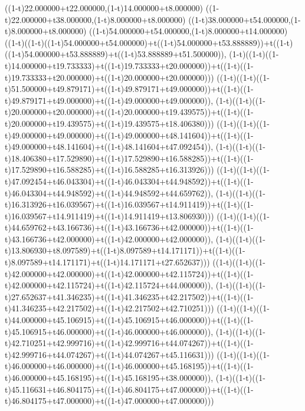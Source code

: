 ((1-t)22.000000+t22.000000,(1-t)14.000000+t8.000000)
((1-t)22.000000+t38.000000,(1-t)8.000000+t8.000000)
((1-t)38.000000+t54.000000,(1-t)8.000000+t8.000000)
((1-t)54.000000+t54.000000,(1-t)8.000000+t14.000000)
((1-t)((1-t)((1-t)54.000000+t54.000000)+t((1-t)54.000000+t53.888889))+t((1-t)((1-t)54.000000+t53.888889)+t((1-t)53.888889+t51.500000)),                                     (1-t)((1-t)((1-t)14.000000+t19.733333)+t((1-t)19.733333+t20.000000))+t((1-t)((1-t)19.733333+t20.000000)+t((1-t)20.000000+t20.000000)))
((1-t)((1-t)((1-t)51.500000+t49.879171)+t((1-t)49.879171+t49.000000))+t((1-t)((1-t)49.879171+t49.000000)+t((1-t)49.000000+t49.000000)),                                     (1-t)((1-t)((1-t)20.000000+t20.000000)+t((1-t)20.000000+t19.439575))+t((1-t)((1-t)20.000000+t19.439575)+t((1-t)19.439575+t18.406380)))
((1-t)((1-t)((1-t)49.000000+t49.000000)+t((1-t)49.000000+t48.141604))+t((1-t)((1-t)49.000000+t48.141604)+t((1-t)48.141604+t47.092454)),                                     (1-t)((1-t)((1-t)18.406380+t17.529890)+t((1-t)17.529890+t16.588285))+t((1-t)((1-t)17.529890+t16.588285)+t((1-t)16.588285+t16.313926)))
((1-t)((1-t)((1-t)47.092454+t46.043304)+t((1-t)46.043304+t44.948592))+t((1-t)((1-t)46.043304+t44.948592)+t((1-t)44.948592+t44.659762)),                                     (1-t)((1-t)((1-t)16.313926+t16.039567)+t((1-t)16.039567+t14.911419))+t((1-t)((1-t)16.039567+t14.911419)+t((1-t)14.911419+t13.806930)))
((1-t)((1-t)((1-t)44.659762+t43.166736)+t((1-t)43.166736+t42.000000))+t((1-t)((1-t)43.166736+t42.000000)+t((1-t)42.000000+t42.000000)),                                     (1-t)((1-t)((1-t)13.806930+t8.097589)+t((1-t)8.097589+t14.171171))+t((1-t)((1-t)8.097589+t14.171171)+t((1-t)14.171171+t27.652637)))
((1-t)((1-t)((1-t)42.000000+t42.000000)+t((1-t)42.000000+t42.115724))+t((1-t)((1-t)42.000000+t42.115724)+t((1-t)42.115724+t44.000000)),                                     (1-t)((1-t)((1-t)27.652637+t41.346235)+t((1-t)41.346235+t42.217502))+t((1-t)((1-t)41.346235+t42.217502)+t((1-t)42.217502+t42.710251)))
((1-t)((1-t)((1-t)44.000000+t45.106915)+t((1-t)45.106915+t46.000000))+t((1-t)((1-t)45.106915+t46.000000)+t((1-t)46.000000+t46.000000)),                                     (1-t)((1-t)((1-t)42.710251+t42.999716)+t((1-t)42.999716+t44.074267))+t((1-t)((1-t)42.999716+t44.074267)+t((1-t)44.074267+t45.116631)))
((1-t)((1-t)((1-t)46.000000+t46.000000)+t((1-t)46.000000+t45.168195))+t((1-t)((1-t)46.000000+t45.168195)+t((1-t)45.168195+t38.000000)),                                     (1-t)((1-t)((1-t)45.116631+t46.804175)+t((1-t)46.804175+t47.000000))+t((1-t)((1-t)46.804175+t47.000000)+t((1-t)47.000000+t47.000000)))

